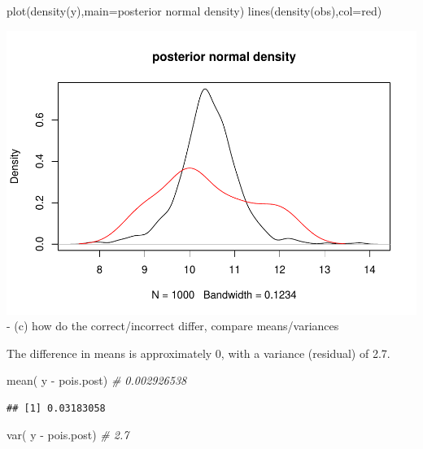 \documentclass[
]{book}
\newenvironment{Shaded}{\begin{snugshade}}{\end{snugshade}}
\newcommand{\AttributeTok}[1]{\textcolor[rgb]{0.77,0.63,0.00}{#1}}
\newcommand{\CommentTok}[1]{\textcolor[rgb]{0.56,0.35,0.01}{\textit{#1}}}
\newcommand{\FunctionTok}[1]{\textcolor[rgb]{0.00,0.00,0.00}{#1}}
\newcommand{\NormalTok}[1]{#1}
\newcommand{\SpecialCharTok}[1]{\textcolor[rgb]{0.00,0.00,0.00}{#1}}
\newcommand{\StringTok}[1]{\textcolor[rgb]{0.31,0.60,0.02}{#1}}
\theoremstyle{definition}
\theoremstyle{definition}
\theoremstyle{definition}
\theoremstyle{definition}
\theoremstyle{remark}
\begin{document}
\begin{Shaded}
\begin{Highlighting}[]
  \FunctionTok{plot}\NormalTok{(}\FunctionTok{density}\NormalTok{(y),}\AttributeTok{main=}\StringTok{\textquotesingle{}posterior normal density\textquotesingle{}}\NormalTok{)}
  \FunctionTok{lines}\NormalTok{(}\FunctionTok{density}\NormalTok{(obs),}\AttributeTok{col=}\StringTok{\textquotesingle{}red\textquotesingle{}}\NormalTok{)}
\end{Highlighting}
\end{Shaded}

\includegraphics{_main_files/figure-latex/unnamed-chunk-40-2.pdf}
- (c) how do the correct/incorrect differ, compare means/variances

The difference in means is approximately 0, with a variance (residual) of 2.7.

\begin{Shaded}
\begin{Highlighting}[]
 \FunctionTok{mean}\NormalTok{( y }\SpecialCharTok{{-}}\NormalTok{ pois.post) }\CommentTok{\# 0.002926538}
\end{Highlighting}
\end{Shaded}

\begin{verbatim}
## [1] 0.03183058
\end{verbatim}

\begin{Shaded}
\begin{Highlighting}[]
 \FunctionTok{var}\NormalTok{( y }\SpecialCharTok{{-}}\NormalTok{ pois.post) }\CommentTok{\# 2.7}
\end{Highlighting}
\end{Shaded}
\end{document}

